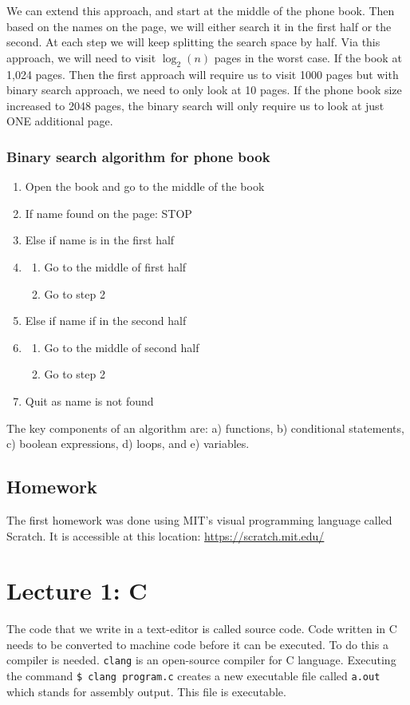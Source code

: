 \documentclass[11pt]{article}
\begin{document}
We can extend this approach, and start at the middle of the phone book. Then based on the names on the page, we will either search it in the first half or the second. At each step we will keep splitting the search space by half. Via this approach, we will need to visit $\log_2(n)$ pages in the worst case. If the book at 1,024 pages. Then the first approach will require us to visit 1000 pages but with binary search approach, we need to only look at 10 pages. If the phone book size increased to 2048 pages, the binary search will only require us to look at just ONE additional page. 

\subsubsection*{Binary search algorithm for phone book}
\begin{enumerate}
	\item Open the book and go to the middle of the book
	\item If name found on the page: STOP
	\item Else if name is in the first half
	\item \begin{enumerate}
		\item Go to the middle of first half 
		\item Go to step 2
		\end{enumerate}
	\item Else if name if in the second half
	\item \begin{enumerate}
		\item Go to the middle of second half 
		\item Go to step 2 
		\end{enumerate}
	\item Quit as name is not found
\end{enumerate}

The key components of an algorithm are: a) functions, b) conditional statements, c) boolean expressions, d) loops, and e) variables. 

\subsection*{Homework}
The first homework was done using MIT's visual programming language called Scratch. It is accessible at this location: \href{https://scratch.mit.edu/}{https://scratch.mit.edu/}

\section*{Lecture 1: C}
The code that we write in a text-editor is called source code. Code written in C needs to be converted to machine code before it can be executed. To do this a compiler is needed. \texttt{clang} is an open-source compiler for C language. Executing the command \texttt{\$ clang program.c} creates a new executable file called \texttt{a.out} which stands for assembly output. This file is executable. 
\end{document}
